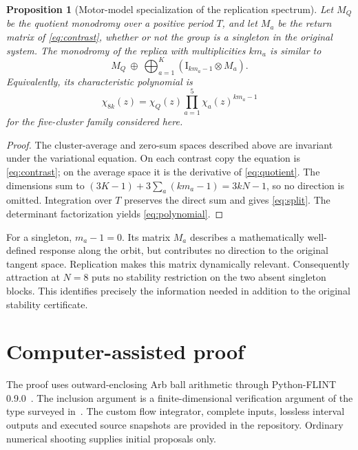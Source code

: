 \documentclass[11pt]{article}
\newtheorem{proposition}[theorem]{Proposition}
\newcommand{\Id}{\mathrm{I}}
\begin{document}
\begin{proposition}[Motor-model specialization of the replication spectrum]
\label{prop:splitting}
Let $M_Q$ be the quotient monodromy over a positive period $T$, and let
$M_a$ be the return matrix of \eqref{eq:contrast}, whether or not the
group is a singleton in the original system. The monodromy of the
replica with multiplicities $km_a$ is similar to
\begin{equation}
 M_Q\ \oplus\ \bigoplus_{a=1}^K
      \left(\Id_{km_a-1}\otimes M_a\right).\label{eq:split}
\end{equation}
Equivalently, its characteristic polynomial is
\begin{equation}
 \chi_{8k}(z)=\chi_Q(z)\prod_{a=1}^5\chi_a(z)^{km_a-1}
 \label{eq:polynomial}
\end{equation}
for the five-cluster family considered here.
\end{proposition}
\begin{proof}
The cluster-average and zero-sum spaces described above are invariant
under the variational equation. On each contrast copy the equation is
\eqref{eq:contrast}; on the average space it is the derivative of
\eqref{eq:quotient}. The dimensions sum to
$(3K-1)+3\sum_a(km_a-1)=3kN-1$, so no direction is omitted.
Integration over $T$ preserves the direct sum and gives \eqref{eq:split}.
The determinant factorization yields \eqref{eq:polynomial}.
\end{proof}

For a singleton, $m_a-1=0$. Its matrix $M_a$ describes a mathematically
well-defined response along the orbit, but contributes no direction to
the original tangent space. Replication makes this matrix dynamically
relevant. Consequently attraction at $N=8$ puts no stability restriction
on the two absent singleton blocks. This identifies precisely the
information needed in addition to the original stability certificate.

\section{Computer-assisted proof}
The proof uses outward-enclosing Arb ball arithmetic through Python-FLINT
0.9.0~\cite{arb}. The inclusion argument is a finite-dimensional
verification argument of the type surveyed in~\cite{rump}. The custom
flow integrator, complete inputs, lossless interval outputs and executed
source snapshots are provided in the repository. Ordinary numerical
shooting supplies initial proposals only.
\end{document}
